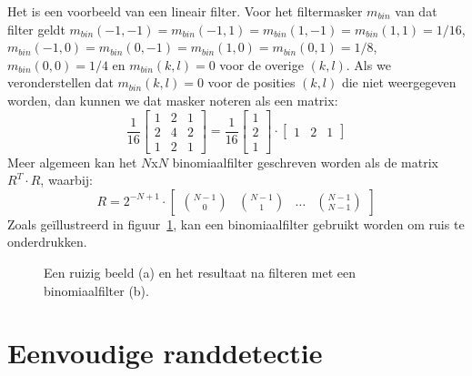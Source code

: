 Het  is een voorbeeld van een lineair filter. Voor het filtermasker 
$m_{bin}$ van dat filter geldt $m_{bin}(-1,-1)=m_{bin}(-1,1)=m_{bin}(1,-1)=m_{bin}(1,1)=1/16$, 
$m_{bin}(-1,0)=m_{bin}(0,-1)=m_{bin}(1,0)=m_{bin}(0,1)=1/8$, $m_{bin}(0,0)=1/4$ en 
$m_{bin}(k,l)=0$ voor de overige $(k,l)$. Als we veronderstellen dat $m_{bin}(k,l)=0$ voor de 
posities $(k,l)$ die niet weergegeven worden, dan kunnen we dat masker noteren als een matrix:
\begin{displaymath}
\frac{1}{16}\left[ \begin{array}{ccc} 1 & 2 & 1\\ 2 & 4 & 2\\ 1 & 2 & 1 \end{array} \right]
= \frac{1}{16}\left[ \begin{array}{c} 1\\ 2\\ 1 \end{array} \right] \cdot 
\left[ \begin{array}{ccc} 1 & 2 & 1 \end{array} \right]
\end{displaymath}
Meer algemeen kan het $N$x$N$ binomiaalfilter geschreven worden als de matrix $R^T \cdot R$,
waarbij: 
\begin{displaymath}
R=2^{-N+1} \cdot \left[ \begin{array}{cccc} \binom{N-1}{0} & \binom{N-1}{1} & 
\ldots & \binom{N-1}{N-1} \end{array} \right]
\end{displaymath}
Zoals ge\"illustreerd in figuur~\ref{fig:indische_ruizig_en_binom}, kan een binomiaalfilter 
gebruikt worden om ruis te onderdrukken.

\begin{figure}[bp]
\vspace{10pt}
\centering
{}
\hspace{1cm}
\caption{\label{fig:indische_ruizig_en_binom}Een ruizig beeld (a) en het resultaat na 
filteren met een binomiaalfilter (b).}
\end{figure}

\section{Eenvoudige randdetectie}
\label{sectie:randdetectie}

